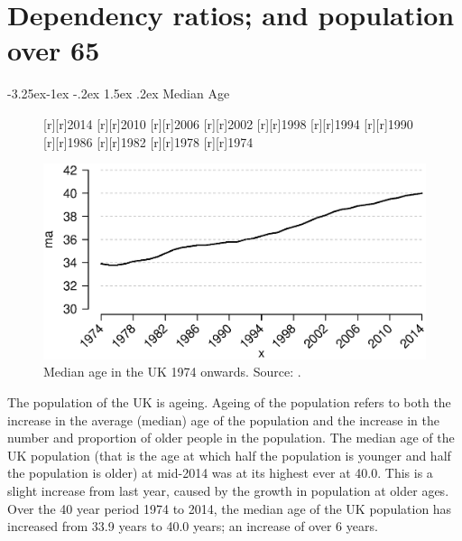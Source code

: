 \documentclass[11 pt, a4paper]{report}
\makeatletter
\renewcommand\subsection{\@startsection{subsection}{2}{\z@}%
                                     {-3.25ex\@plus -1ex \@minus -.2ex}%
                                     {1.5ex \@plus .2ex}%
    								{\large\scshape}}
\makeatother
\begin{document}
%



\chapter{Dependency ratios; and population over 65} %
\subsection{Median Age}

\begin{figure}[hbtp!]
[r][r]{\small{2014}}
[r][r]{\small{2010}}
[r][r]{\small{2006}}
[r][r]{\small{2002}}
[r][r]{\small{1998}}
[r][r]{\small{1994}}
[r][r]{\small{1990}}
[r][r]{\small{1986}}
[r][r]{\small{1982}}
[r][r]{\small{1978}}
[r][r]{\small{1974}}


\includegraphics[width=\textwidth]{../figures/Fig4.1.eps}
\caption{Median age in the UK 1974 onwards. Source: \citet{ONS2015b}.}
\label{Fig:12}
\end{figure}

The population of the UK is ageing. Ageing of the population refers to both the increase in the average (median) age of the population and the increase in the number and proportion of older people in the population.
The median age of the UK population (that is the age at which half the population is younger and half the population is older) at mid-2014 was at its highest ever at 40.0. This is a slight increase from last year, caused by the growth in population at older ages. 
Over the 40 year period 1974 to 2014, the median age of the UK population has increased from 33.9 years to 40.0 years; an increase of over 6 years.
\end{document}
